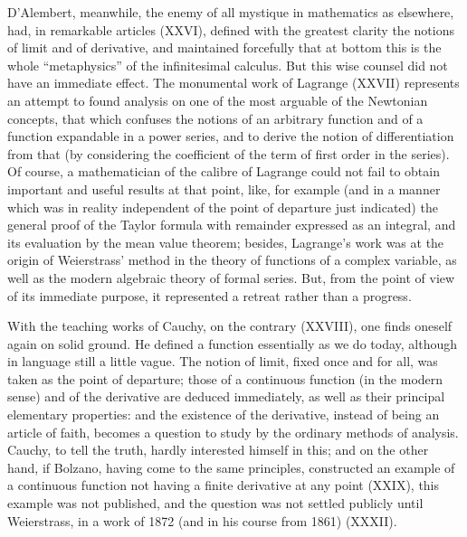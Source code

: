D'Alembert, meanwhile, the enemy of all mystique in mathematics as elsewhere, had, in remarkable articles (XXVI), defined with the greatest clarity the notions of limit and of derivative, and maintained forcefully that at bottom this is the whole ``metaphysics'' of the infinitesimal calculus. But this wise counsel did not have an immediate effect. The monumental work of Lagrange (XXVII) represents an attempt to found analysis on one of the most arguable of the Newtonian concepts, that which confuses the notions of an arbitrary function and of a function expandable in a power series, and to derive the notion of differentiation from that (by considering the coefficient of the term of first order in the series). Of course, a mathematician of the calibre of Lagrange could not fail to obtain important and useful results at that point, like, for example (and in a manner which was in reality independent of the point of departure just indicated) the general proof of the Taylor formula with remainder expressed as an integral, and its evaluation by the mean value theorem; besides, Lagrange's work was at the origin of Weierstrass' method in the theory of functions of a complex variable, as well as the modern algebraic theory of formal series. But, from the point of view of its immediate purpose, it represented a retreat rather than a progress.

With the teaching works of Cauchy, on the contrary (XXVIII), one finds oneself again on solid ground. He defined a function essentially as we do today, although in language still a little vague. The notion of limit, fixed once and for all, was taken as the point of departure; those of a continuous function (in the modern sense) and of the derivative are deduced immediately, as well as their principal elementary properties: and the existence of the derivative, instead of being an article of faith, becomes a question to study by the ordinary methods of analysis. Cauchy, to tell the truth, hardly interested himself in this; and on the other hand, if Bolzano, having come to the same principles, constructed an example of a continuous function not having a finite derivative at any point (XXIX), this example was not published, and the question was not settled publicly until Weierstrass, in a work of 1872 (and in his course from 1861) (XXXII).

